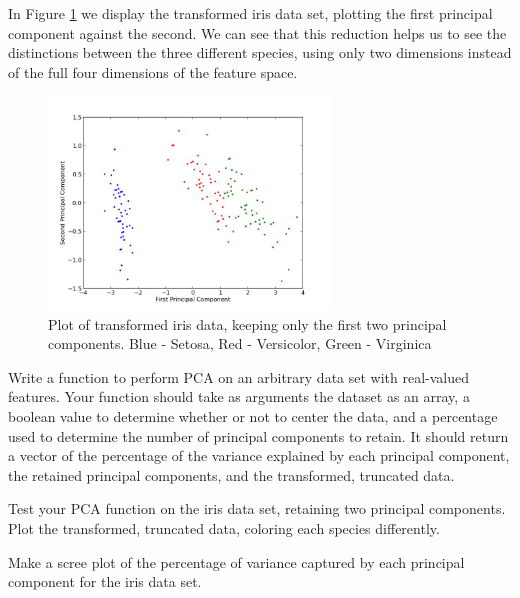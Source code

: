 In Figure \ref{irispca} we display the transformed iris data set, plotting the first principal component against the second. We can see that this reduction helps us to see the distinctions between the three different species, using only two dimensions instead of the full four dimensions of the feature space.

\begin{figure}\label{irispca}
\centering
\includegraphics[width=7.5cm]{irispca.jpg}
\caption{Plot of transformed iris data, keeping only the first two principal components. Blue - Setosa, Red - Versicolor, Green - Virginica}
\end{figure}

\begin{problem}
Write a function to perform PCA on an arbitrary data set with real-valued features. Your function should take as arguments the dataset as an array, a boolean value to determine whether or not to center the data, and a percentage used to determine the number of principal components to retain. It should return a vector of the percentage of the variance explained by each principal component, the retained principal components, and the transformed, truncated data.
\end{problem}

\begin{problem}
Test your PCA function on the iris data set, retaining two principal components. Plot the transformed, truncated data, coloring each species differently.
\end{problem}

\begin{problem}
Make a scree plot of the percentage of variance captured by each principal component for the iris data set.
\end{problem}